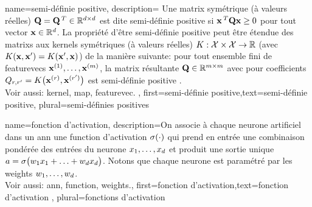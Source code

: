 {name={semi-définie positive},
	description={
		Une \gls{matrix} symétrique (à valeurs réelles) $\mathbf{Q} = \mathbf{Q}\,^{T} \in \mathbb{R}^{d \times d}$ 
		est dite semi-définie positive si ${\bf x}\,^{T} \mathbf{Q} {\bf x} \geq 0$ pour tout \gls{vector} ${\bf x} \in \mathbb{R}^{d}$. 
		La propriété d’être semi-définie positive peut être étendue des \glspl{matrix} aux \glspl{kernel} symétriques (à valeurs réelles) 
		$K: \mathcal{X} \times \mathcal{X} \rightarrow \mathbb{R}$ (avec $K({\bf x},{\bf x}') = K({\bf x}',{\bf x})$)
		de la manière suivante: pour tout ensemble fini de \glspl{featurevec} ${\bf x}^{(1)},\dots,{\bf x}^{(m)}$, 
		la \gls{matrix} résultante $\mathbf{Q} \in \mathbb{R}^{m \times m}$ avec pour coefficients  
		$Q_{r,r'} = K\big({\bf x}^{(r)},{\bf x}^{(r')}\big)$ 
		est semi-définie positive \cite{LearningKernelsBook}.
		\\
		Voir aussi: \gls{kernel}, \gls{map}, \gls{featurevec}.
	},
	first={semi-définie positive},text={semi-définie positive}, plural={semi-définies positives}
}

{name={fonction d'activation},
	description={On associe à chaque neurone artificiel dans un \gls{ann} 
		une \gls{function} d'activation $\sigma(\cdot)$ qui prend en entrée une combinaison pondérée 
		des entrées du neurone $x_{1},\ldots,x_{d}$ et produit une 
		sortie unique $a = \sigma\big(w_{1} x_{1}+\ldots+w_{d} x_{d} \big)$. 
		Notons que chaque neurone est paramétré par les \gls{weights} $w_{1},\ldots,w_{d}$.
		\\ 
		Voir aussi: \gls{ann}, \gls{function}, \gls{weights}.},
	first={fonction d'activation},text={fonction d'activation} , plural={fonctions d'activation}
}


